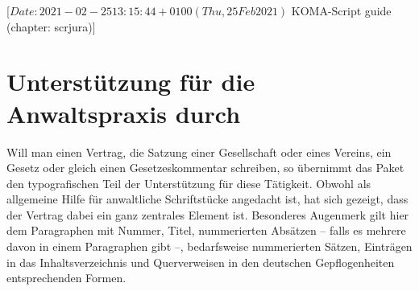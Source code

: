 %
%
%
%
%
%
%
%
% 
%
%
%
%

%
                 [$Date: 2021-02-25 13:15:44 +0100 (Thu, 25 Feb 2021) $
                  KOMA-Script guide (chapter: scrjura)]

\chapter{Unterstützung für die Anwaltspraxis durch }
\BeginIndexGroup
{}

Will man einen Vertrag, die Satzung einer
Gesellschaft oder eines Vereins, ein Gesetz oder gleich einen
Gesetzeskommentar schreiben, so übernimmt das Paket  den
typografischen Teil der Unterstützung für diese Tätigkeit. Obwohl
 als allgemeine Hilfe für anwaltliche Schriftstücke angedacht
ist, hat sich gezeigt, dass der Vertrag dabei ein ganz zentrales Element
ist. Besonderes Augenmerk gilt hier dem
Paragraphen mit Nummer, Titel, nummerierten
Absätzen -- falls es mehrere davon in einem Paragraphen gibt --, bedarfsweise
nummerierten Sätzen, Einträgen in das Inhaltsverzeichnis und Querverweisen in
den deutschen Gepflogenheiten entsprechenden Formen.

